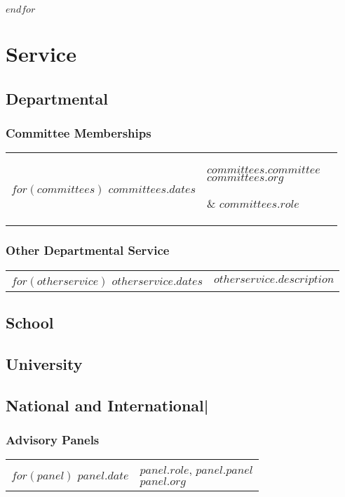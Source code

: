 \documentclass[martgin, line]{article}
\begin{document}
$endfor$

\section*{Service}

\subsection{Departmental}

\subsubsection*{Committee Memberships}

\setlength{\extrarowheight}{.75em}
\begin{longtable}[l]{lp{3.5in}l}
  $for(committees)$
  $committees.dates$& 
  \parbox[t]{3.5in} { $committees.committee$\\
    \scriptsize{%
      $committees.org$
    }} &  $committees.role$ \\
  $endfor$
\end{longtable}
\setlength{\extrarowheight}{0em}

\subsubsection*{Other Departmental Service}

\setlength{\extrarowheight}{.75em}
\begin{longtable}[l]{lp{5.5in}}
  $for(otherservice)$
  $otherservice.dates$& 
  \parbox[t]{5.5in} { 
    $otherservice.description$
  } \\
  $endfor$
\end{longtable}
\setlength{\extrarowheight}{0em}

\subsection{School}

\subsection{University}

\subsection{National and International|}

\subsubsection*{Advisory Panels}
\setlength{\extrarowheight}{.75em}
\begin{tabular}{lp{5.5in}}   
$for(panel)$
$panel.date$&
\parbox[t]{5.5in}{$panel.role$, $panel.panel$\\
  \textit{$panel.org$}}\\
$endfor$
\end{tabular}
\setlength{\extrarowheight}{0em}
\end{document}
